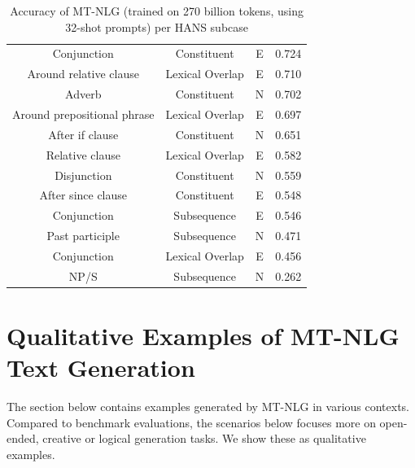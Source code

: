 \documentclass[11pt]{article}
\newcommand{\ours}{MT-NLG}
\begin{document}
\begin{table}[]
\begin{tabular}{cccc}
Conjunction                   & Constituent        & E              & 0.724             \\
Around   relative clause      & Lexical Overlap    & E              & 0.710              \\
Adverb                        & Constituent        & N              & 0.702             \\
Around   prepositional phrase & Lexical Overlap    & E              & 0.697             \\
After if   clause             & Constituent        & N              & 0.651             \\
Relative   clause             & Lexical Overlap    & E              & 0.582             \\
Disjunction                   & Constituent        & N              & 0.559             \\
After   since clause          & Constituent        & E              & 0.548             \\
Conjunction                   & Subsequence        & E              & 0.546             \\
Past   participle             & Subsequence        & N              & 0.471             \\
Conjunction                   & Lexical Overlap    & E              & 0.456             \\
NP/S                          & Subsequence        & N              & 0.262            \\
\bottomrule
\end{tabular}
\caption{Accuracy of MT-NLG (trained on 270 billion tokens, using 32-shot prompts) per HANS subcase}
\label{tab:hans_subcase_acc}
\end{table}

\section{Qualitative Examples of {\ours} Text Generation}
\label{sec:supp_mat}

The section below contains examples generated by {\ours} in various contexts. Compared to benchmark evaluations, the scenarios below focuses more on open-ended, creative or logical generation tasks. We show these as qualitative examples.
\end{document}
